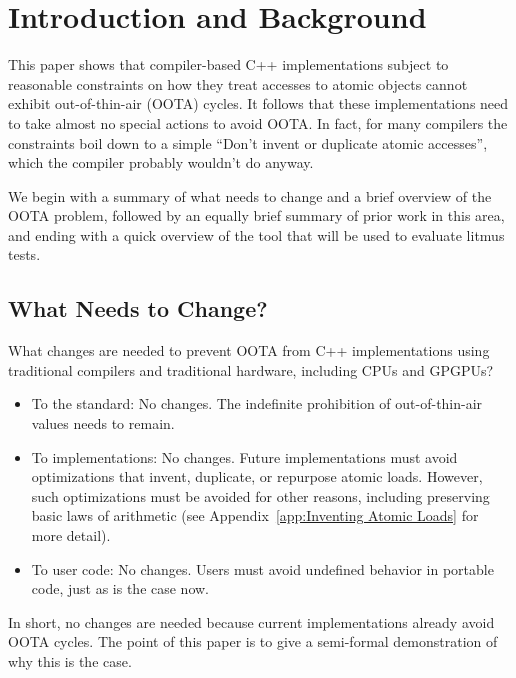 \documentclass[10]{article}
\begin{document}
\pagebreak

\tableofcontents

\pagebreak

\section{Introduction and Background}
\label{sec:Introduction}

This paper shows that compiler-based C++ implementations subject to
reasonable constraints on how they treat accesses to atomic objects
cannot exhibit out-of-thin-air (OOTA) cycles.
It follows that these implementations need to take almost no special
actions to avoid OOTA.
In fact, for many compilers the constraints boil down to a simple
``Don't invent or duplicate atomic accesses'', which the compiler
probably wouldn't do anyway.

We begin with a summary of what needs to change and a brief overview of
the OOTA problem, followed by an equally brief summary of prior work in
this area, and ending with a quick overview of the  tool that
will be used to evaluate litmus tests.

\subsection{What Needs to Change?}
\label{sec:What Needs to Change?}

What changes are needed to prevent OOTA from C++ implementations using
traditional compilers and traditional hardware, including CPUs and
GPGPUs?

\begin{itemize}
\item	To the standard:
	No changes.
	The indefinite prohibition of out-of-thin-air values needs
	to remain.
\item	To implementations:
	No changes.
	Future implementations must avoid optimizations that invent,
	duplicate, or repurpose atomic loads.
	However, such optimizations must be avoided for other reasons,
	including preserving basic laws of arithmetic
	(see Appendix~\ref{app:Inventing Atomic Loads} for more detail).
\item	To user code:
	No changes.
	Users must avoid undefined behavior in portable code, just as
	is the case now.
\end{itemize}

In short, no changes are needed because current implementations already
avoid OOTA cycles.
The point of this paper is to give a semi-formal demonstration of
why this is the case.
\end{document}
